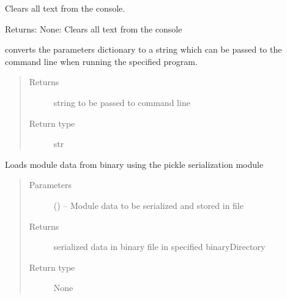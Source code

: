\documentclass[letterpaper,10pt,english]{sphinxmanual}
\begin{document}
\begin{fulllineitems}

\begin{fulllineitems}
\label{\detokenize{MouseReferenceManual:Modules.Base.ModuleBaseClass.clearScreen}}
Clears all text from the console.

Returns:
None: Clears all text from the console

\end{fulllineitems}


\begin{fulllineitems}
\label{\detokenize{MouseReferenceManual:Modules.Base.ModuleBaseClass.commandLineArguments}}
converts the parameters dictionary to a string which can be passed to the command line when running the specified program.
\begin{quote}\begin{description}
\item[{Returns}] \leavevmode
string to be passed to command line

\item[{Return type}] \leavevmode
str

\end{description}\end{quote}

\end{fulllineitems}


\begin{fulllineitems}
\label{\detokenize{MouseReferenceManual:Modules.Base.ModuleBaseClass.loadData}}
Loads module data from binary using the pickle serialization module
\begin{quote}\begin{description}
\item[{Parameters}] \leavevmode
{} () -- Module data to be serialized and stored in file

\item[{Returns}] \leavevmode
serialized data in binary file in specified binaryDirectory

\item[{Return type}] \leavevmode
None


\end{description}
\end{quote}
\end{fulllineitems}
\end{fulllineitems}
\end{document}
